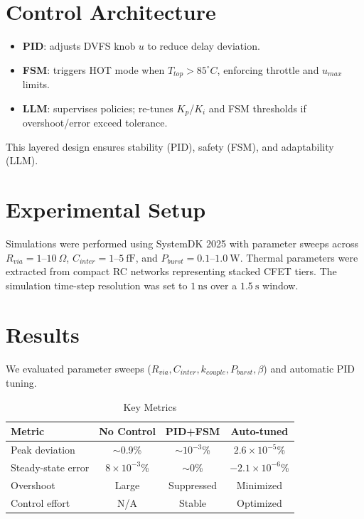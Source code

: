 \documentclass[conference]{IEEEtran}
\begin{document}
\section{Control Architecture}
\begin{itemize}
  \item \textbf{PID}: adjusts DVFS knob $u$ to reduce delay deviation.
  \item \textbf{FSM}: triggers HOT mode when $T_{top} > 85^\circ C$, enforcing throttle and $u_{max}$ limits.
  \item \textbf{LLM}: supervises policies; re-tunes $K_p$/$K_i$ and FSM thresholds if overshoot/error exceed tolerance.
\end{itemize}
This layered design ensures stability (PID), safety (FSM), and adaptability (LLM).

\section{Experimental Setup}
Simulations were performed using SystemDK 2025 with parameter sweeps
across $R_{via} = 1\text{--}10\ \Omega$,
$C_{inter} = 1\text{--}5\ \mathrm{fF}$,
and $P_{burst} = 0.1\text{--}1.0\ \mathrm{W}$.
Thermal parameters were extracted from compact RC networks
representing stacked CFET tiers.
The simulation time-step resolution was set to $1\ \mathrm{ns}$ 
over a $1.5\ \mathrm{s}$ window.

\section{Results}
We evaluated parameter sweeps ($R_{via}, C_{inter}, k_{couple}, P_{burst}, \beta$)
and automatic PID tuning.

\begin{table}[h]
\centering
\caption{Key Metrics}
\begin{tabular}{|l|c|c|c|}
\hline
Metric & No Control & PID+FSM & Auto-tuned \\
\hline
Peak deviation & $\sim$0.9\% & $\sim$$10^{-3}$\% & $2.6\times 10^{-5}$\% \\
Steady-state error & $8\times 10^{-3}$\% & $\sim$0\% & $-2.1\times 10^{-6}$\% \\
Overshoot & Large & Suppressed & Minimized \\
Control effort & N/A & Stable & Optimized \\
\hline
\end{tabular}
\end{table}
\end{document}
